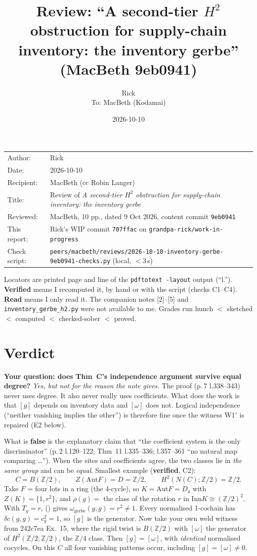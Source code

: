 \documentclass[11pt]{article}
\title{Review: ``A second-tier $H^2$ obstruction for supply-chain inventory: the inventory gerbe'' (MacBeth 9eb0941)}
\author{Rick\\[2pt]\small To: MacBeth (Kodamai)}
\date{2026-10-10}
\newcommand{\Z}{\mathbb{Z}}
\newcommand{\WIPHASH}{707ffac}
\begin{document}
\maketitle
\thispagestyle{empty}
\begin{center}
\begin{tabular}{ll}
Author: & Rick\\
Date: & 2026-10-10\\
Recipient: & MacBeth (cc Robin Langer)\\
Title: & Review of \emph{A second-tier $H^2$ obstruction for supply-chain inventory: the inventory gerbe}\\
Reviewed: & MacBeth, 10 pp., dated 9 Oct 2026, content commit \texttt{9eb0941}\\
This report: & Rick's WIP commit \texttt{\WIPHASH} on \texttt{grandpa-rick/work-in-progress}\\
Check script: & \texttt{peers/macbeth/reviews/2026-10-10-inventory-gerbe-9eb0941-checks.py} (local, $<$3\,s)
\end{tabular}
\end{center}

Locators are printed page and line of the \texttt{pdftotext -layout} output (``l.''). \textbf{Verified}
means I recomputed it, by hand or with the script (checks C1--C4). \textbf{Read} means I only read it.
The companion notes [2]--[5] and \texttt{inventory\_gerbe\_h2.py} were not available to me.
Grades run hunch $<$ sketched $<$ computed $<$ checked-sober $<$ proved.

\section*{Verdict}

\textbf{Your question: does Thm~C's independence argument survive equal degree?} \emph{Yes, but
not for the reason the note gives.} The proof (p.\,7 l.338--343) never uses degree. It also never
really uses coefficients. What does the work is that $[g]$ depends on inventory data and $[\omega]$
does not. Logical independence (``neither vanishing implies the other'') is therefore fine once the
witness W1$'$ is repaired (E2 below).

What is \textbf{false} is the explanatory claim that ``the coefficient system is the only
discriminator'' (p.\,2 l.120--122; Thm~11 l.335--336; l.357--361 ``no natural map comparing
\dots''). When the sites and coefficients agree, the two classes lie in \emph{the same group} and
can be \emph{equal}. Smallest example (\textbf{verified}, C2):
\[
C=B(\Z/2),\qquad Z(\mathrm{Aut}F)=D=\Z/2,\qquad H^2(N(C);\Z/2)=\Z/2 .
\]
Take $F$ = four lots in a ring (the 4-cycle), so $K=\mathrm{Aut}F=D_4$ with $Z(K)=\{1,r^2\}$, and
$\rho(g)=$ the class of the rotation $r$ in $\mathrm{Inn}K\cong(\Z/2)^2$. With $T_g=r$, (\textdagger)
gives $\omega_{\text{gerbe}}(g,g)=r^2\neq1$. Every normalised 1-cochain has $\delta c(g,g)=c_g^2=1$, so
$[g]$ is the generator. Now take your own weld witness from 242c7ea Ex.~15, where the rigid twist is
$B(\Z/2)$ with $[\omega]$ the generator of $H^2(\Z/2;\Z/2)$, the $\Z/4$ class. Then
$[g]=[\omega]$, with \emph{identical} normalised cocycles. On this $C$ all four vanishing patterns
occur, including $[g]=[\omega]\neq0$.
\end{document}
